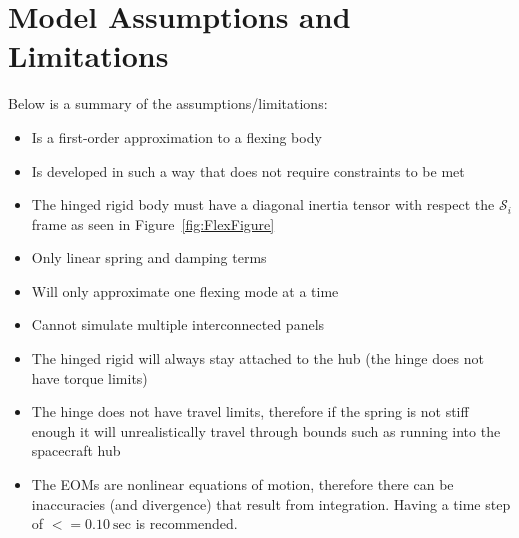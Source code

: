 \section{Model Assumptions and Limitations}
Below is a summary of the assumptions/limitations:

\begin{itemize}
	\item Is a first-order approximation to a flexing body
\item Is developed in such a way that does not require constraints to be met
	\item The hinged rigid body must have a diagonal inertia tensor with respect the $\mathcal{S}_i$ frame as seen in Figure~\ref{fig:FlexFigure}
	\item Only linear spring and damping terms
	\item Will only approximate one flexing mode at a time
	\item Cannot simulate multiple interconnected panels
	\item The hinged rigid will always stay attached to the hub (the hinge does not have torque limits)
	\item The hinge does not have travel limits, therefore if the spring is not stiff enough it will unrealistically travel through bounds such as running into the spacecraft hub
	\item The EOMs are nonlinear equations of motion, therefore there can be inaccuracies (and divergence) that result from integration. Having a time step of $<= 0.10\ \text{sec}$ is recommended.
\end{itemize}